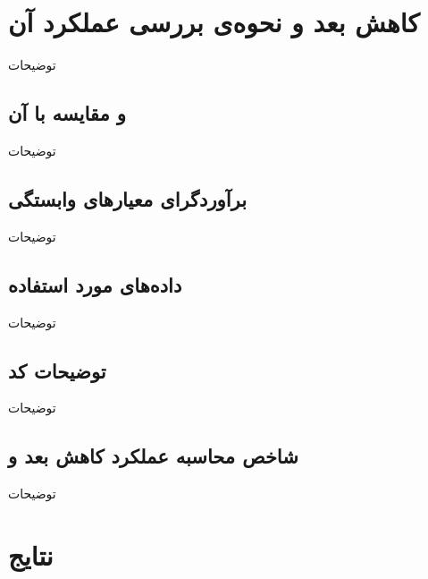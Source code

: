 \chapter{
کاهش بعد و نحوه‌ی بررسی عملکرد آن
}
توضیحات

\section{
و مقایسه با آن
}
توضیحات
\section{
برآوردگر‌ای معیارهای وابستگی
}
توضیحات
\section{
داده‌های مورد استفاده
}
توضیحات
\section{
توضیحات کد
}
توضیحات
\section{
شاخص محاسبه عملکرد کاهش بعد و 
}
توضیحات

\chapter{
نتایج
}




















